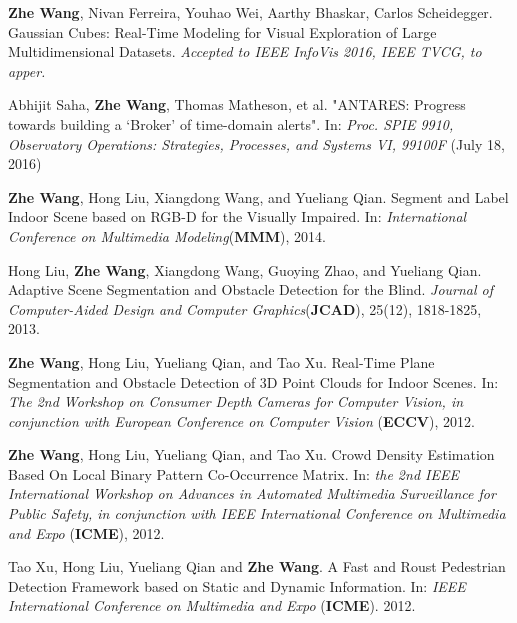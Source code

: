 \documentclass[10pt]{article}
\begin{document}
\begin{bibenum}
    \item \textbf{Zhe Wang}, Nivan Ferreira, Youhao Wei, Aarthy Bhaskar, Carlos Scheidegger. Gaussian Cubes: Real-Time Modeling for Visual Exploration of Large Multidimensional Datasets. 
        \emph{Accepted to IEEE InfoVis 2016, IEEE TVCG, to apper.}

    \item Abhijit Saha, \textbf{Zhe Wang}, Thomas Matheson, et al. "ANTARES: Progress towards building a ‘Broker’ of time-domain alerts". 
        In: \emph{Proc. SPIE 9910, Observatory Operations: Strategies, Processes, and Systems VI, 99100F} (July 18, 2016)

    \item \textbf{Zhe Wang}, Hong Liu, Xiangdong Wang, and Yueliang Qian. Segment and Label Indoor Scene based on RGB-D for the Visually Impaired.
        In: \emph{International Conference on Multimedia Modeling}(\textbf{MMM}), 2014.

    \item Hong Liu, \textbf{Zhe Wang}, Xiangdong Wang, Guoying Zhao, and Yueliang Qian. Adaptive Scene Segmentation and Obstacle Detection for the Blind.
        \emph{Journal of Computer-Aided Design and Computer Graphics}(\textbf{JCAD}), 25(12), 1818-1825, 2013.

    \item \textbf{Zhe Wang}, Hong Liu, Yueliang Qian, and Tao Xu. Real-Time Plane Segmentation and Obstacle Detection of 3D Point Clouds for Indoor Scenes.
        In: \emph{The 2nd Workshop on Consumer Depth Cameras for Computer Vision, in conjunction with European Conference on Computer Vision} (\textbf{ECCV}), 2012.

    \item \textbf{Zhe Wang}, Hong Liu, Yueliang Qian, and Tao Xu. Crowd Density Estimation Based On Local Binary Pattern Co-Occurrence Matrix.
        In: \emph{the 2nd IEEE International Workshop on Advances in Automated Multimedia Surveillance for Public Safety, in conjunction with IEEE International Conference on Multimedia and Expo }(\textbf{ICME}), 2012.

    \item Tao Xu, Hong Liu, Yueliang Qian and \textbf{Zhe Wang}. A Fast and Roust Pedestrian Detection Framework based on Static and Dynamic Information.
        In: \emph{IEEE International Conference on Multimedia and Expo} (\textbf{ICME}). 2012.
\end{bibenum}
\end{document}
